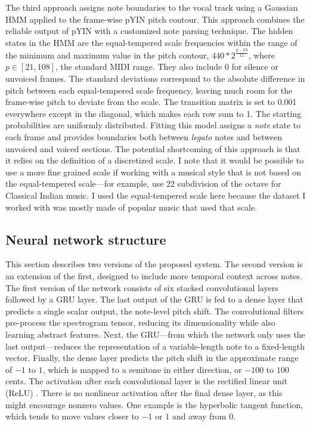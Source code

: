 The third approach assigns note boundaries to the vocal track using a Gaussian HMM applied to the frame-wise pYIN pitch contour. This approach combines the reliable output of pYIN with a customized note parsing technique. The hidden states in the HMM are the equal-tempered scale frequencies within the range of the minimum and maximum value in the pitch contour, $440 * 2^{\frac{p - 69}{12}}$, where $p \in [21, 108]$, the standard MIDI range. They also include 0 for silence or unvoiced frames. The standard deviations correspond to the absolute difference in pitch between each equal-tempered scale frequency, leaving much room for the frame-wise pitch to deviate from the scale. The transition matrix is set to 0.001 everywhere except in the diagonal, which makes each row sum to 1. The starting probabilities are uniformly distributed. Fitting this model assigns a \textit{note} state to each frame and provides boundaries both between \textit{legato} notes and between unvoiced and voiced sections. The potential shortcoming of this approach is that it relies on the definition of a discretized scale. I note that it would be possible to use a more fine grained scale if working with a musical style that is not based on the equal-tempered scale---for example, use 22 subdivision of the octave for Classical Indian music. I used the equal-tempered scale here because the dataset I worked with was mostly made of popular music that used that scale.  

\subsection{Neural network structure}
This section describes two versions of the proposed system. The second version is an extension of the first, designed to include more temporal context across notes. The first version of the network consists of six stacked convolutional layers followed by a GRU layer. The last output of the GRU is fed to a dense layer that predicts a single scalar output, the note-level pitch shift. The convolutional filters pre-process the spectrogram tensor, reducing its dimensionality while also learning abstract features. Next, the GRU---from which the network only uses the last output---reduces the representation of a variable-length note to a fixed-length vector. Finally, the dense layer predicts the pitch shift in the approximate range of $-1$ to $1$, which is mapped to a semitone in either direction, or $-100$ to $100$ cents. The activation after each convolutional layer is the rectified linear unit (ReLU) \cite{he2015delving}. There is no nonlinear activation after the final dense layer, as this might encourage nonzero values. One example is the hyperbolic tangent function, which tends to move values closer to $-1$ or $1$ and away from 0. 

